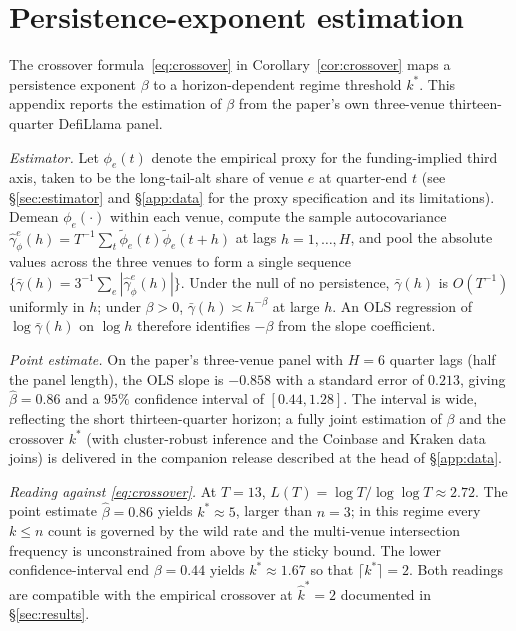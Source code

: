 \documentclass[12pt]{article}
\theoremstyle{sampledef}
\theoremstyle{sampleplain}
\theoremstyle{sampleremark}
\newcommand{\1}{\mathbf{1}}
\begin{document}
\section{Persistence-exponent estimation}\label{app:beta}

The crossover formula~\eqref{eq:crossover} in
Corollary~\ref{cor:crossover} maps a persistence exponent
$\beta$ to a horizon-dependent regime threshold $k^\ast$. This
appendix reports the estimation of $\beta$ from the paper's own
three-venue thirteen-quarter DefiLlama panel.

\textit{Estimator.} Let $\phi_e(t)$ denote the empirical proxy for
the funding-implied third axis, taken to be the long-tail-alt
share of venue $e$ at quarter-end $t$ (see \S\ref{sec:estimator}
and \S\ref{app:data} for the proxy specification and
its limitations). Demean $\phi_e(\cdot)$ within each venue, compute
the sample autocovariance $\hat\gamma_\phi^{e}(h) = T^{-1}\sum_t
\tilde\phi_e(t)\tilde\phi_e(t+h)$ at lags $h = 1,\dots,H$, and
pool the absolute values across the three venues to form a single
sequence $\{\bar\gamma(h) = 3^{-1}\sum_e |\hat\gamma_\phi^{e}(h)|\}$.
Under the null of no persistence, $\bar\gamma(h)$ is $O(T^{-1})$
uniformly in $h$; under $\beta > 0$, $\bar\gamma(h) \asymp h^{-\beta}$
at large $h$. An OLS regression of $\log\bar\gamma(h)$ on $\log h$
therefore identifies $-\beta$ from the slope coefficient.

\textit{Point estimate.} On the paper's three-venue panel with
$H = 6$ quarter lags (half the panel length), the OLS slope is
$-0.858$ with a standard error of $0.213$, giving
$\hat\beta = 0.86$ and a $95\%$ confidence interval of
$[0.44, 1.28]$. The interval is wide, reflecting the short
thirteen-quarter horizon; a fully joint estimation of $\beta$ and
the crossover $k^\ast$ (with cluster-robust inference and the
Coinbase and Kraken data joins) is delivered in the companion
release described at the head of \S\ref{app:data}.

\textit{Reading against \eqref{eq:crossover}.} At $T = 13$,
$L(T) = \log T / \log\log T \approx 2.72$. The point estimate
$\hat\beta = 0.86$ yields $k^\ast \approx 5$, larger than $n = 3$;
in this regime every $k\le n$ count is governed by the wild rate
and the multi-venue intersection frequency is unconstrained from
above by the sticky bound. The lower confidence-interval end
$\beta = 0.44$ yields $k^\ast \approx 1.67$ so that
$\lceil k^\ast\rceil = 2$. Both readings are compatible with the
empirical crossover at $\hat k^\ast = 2$ documented in
\S\ref{sec:results}.
\end{document}

